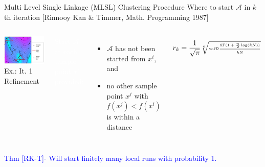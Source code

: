 \documentclass[handout,aspectratio=54]{beamer}
\numberwithin{theorem}{section}
\begin{document}
\begin{frame}{Multi Level Single Linkage (MLSL) Clustering Procedure}
\small
Where to start $\mathcal{A}$ in $k$th iteration \scriptsize\textcolor[RGB]{128,0,128}{ [Rinnooy Kan \& Timmer, Math. Programming 1987]}
\normalsize

\begin{columns}
\includegraphics[width=\textwidth]{fig/39-4.jpg}
Ex.: It. 1 Refinement

\colorbox[rgb]{0.5,0.6,0.7}{\textcolor{white}{Start $\mathcal{A}$ at each sample point}}
\colorbox[rgb]{0.5,0.6,0.7}{\textcolor{white}{$x^i$ provided:}}

\begin{itemize}
\item $\mathcal{A}$ has not been started from $x^i$, and
\item no other sample point $x^j$ with $f(x^j)<f(x^i)$ is within a distance
\end{itemize}
\begin{equation*}\tiny
r_k=\frac{1}{\sqrt{\pi}}\sqrt[n]{\textup{vol}\mathcal{D}\frac{5\Gamma(1+\frac{n}{2}\log(kN))}{kN}}
\end{equation*}
\end{columns}

\textcolor{blue}{Thm [RK-T]- Will start finitely many local runs with probability 1.}
\end{frame}
\end{document}
